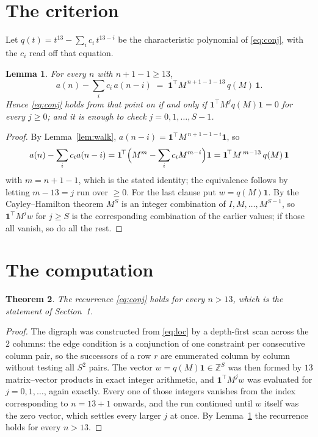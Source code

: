 \documentclass[11pt,a4paper]{article}
\theoremstyle{plain}
\newtheorem{theorem}{Theorem}
\newtheorem{lemma}[theorem]{Lemma}
\theoremstyle{definition}
\begin{document}
\section{The criterion}

Let $q(t)=t^{13}-\sum_i c_i\,t^{13-i}$ be the characteristic polynomial of
\eqref{eq:conj}, with the $c_i$ read off that equation.

\begin{lemma}\label{lem:crit}
For every $n$ with $n+1-1\ge13$,
\[
a(n)-\sum_i c_i\,a(n-i)\;=\;\mathbf{1}^{\!\top}M^{\,n+1-1-13}\,q(M)\,\mathbf{1} .
\]
Hence \eqref{eq:conj} holds from that point on if and only if
$\mathbf{1}^{\!\top}M^{j}q(M)\mathbf{1}=0$ for every $j\ge0$; and it is enough to check
$j=0,1,\dots,S-1$.
\end{lemma}

\begin{proof}
By Lemma~\ref{lem:walk}, $a(n-i)=\mathbf{1}^{\!\top}M^{\,n+1-1-i}\mathbf{1}$, so
\[
a(n)-\sum_i c_i a(n-i)
=\mathbf{1}^{\!\top}\Bigl(M^{m}-\sum_i c_i M^{m-i}\Bigr)\mathbf{1}
=\mathbf{1}^{\!\top}M^{\,m-13}\,q(M)\,\mathbf{1}
\]
with $m=n+1-1$, which is the stated identity; the equivalence follows by letting
$m-13=j$ run over $\ge0$. For the last clause put $w=q(M)\mathbf{1}$. By the
Cayley--Hamilton theorem $M^{S}$ is an integer combination of $I,M,\dots,M^{S-1}$, so
$\mathbf{1}^{\!\top}M^{j}w$ for $j\ge S$ is the corresponding combination of the earlier
values; if those all vanish, so do all the rest.
\end{proof}

\section{The computation}

\begin{theorem}
The recurrence \eqref{eq:conj} holds for every $n>13$, which is the statement of
Section~1.
\end{theorem}

\begin{proof}
The digraph was constructed from \eqref{eq:loc} by a depth-first scan across the $2$
columns: the edge condition is a conjunction of one constraint per consecutive column
pair, so the successors of a row $r$ are enumerated column by column without testing all
$S^2$ pairs. The vector $w=q(M)\mathbf{1}\in\mathbb{Z}^{S}$ was then formed by $13$
matrix--vector products in exact integer arithmetic, and $\mathbf{1}^{\!\top}M^{j}w$ was
evaluated for $j=0,1,\dots$, again exactly. Every one of those integers vanishes from the
index corresponding to $n=13+1$ onwards, and the run continued until $w$ itself was the
zero vector, which settles every larger $j$ at once. By Lemma~\ref{lem:crit} the recurrence
holds for every $n>13$.
\end{proof}
\end{document}
